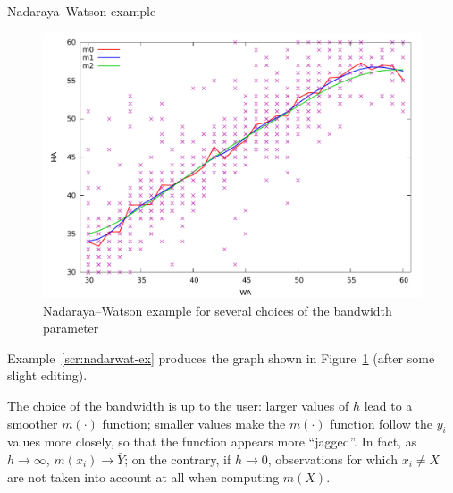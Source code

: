 \begin{script}[htbp]
  \caption{Nadaraya--Watson example}
  \label{scr:nadarwat-ex}
\end{script}

\begin{figure}[htbp]
  \centering
  \includegraphics[scale=0.5]{figures/nadarwat-ex}
  \caption{Nadaraya--Watson example for several choices of the bandwidth parameter}
  \label{fig:nadarwat-ex}
\end{figure}

Example~\ref{scr:nadarwat-ex} produces the graph shown in
Figure~\ref{fig:nadarwat-ex} (after some slight editing).

The choice of the bandwidth is up to the user: larger values of $h$
lead to a smoother $m(\cdot)$ function; smaller values make the
$m(\cdot)$ function follow the $y_i$ values more closely, so that the
function appears more ``jagged''. In fact, as $h \to \infty$, $m(x_i)
\to \bar{Y}$; on the contrary, if $h $, observations for which
$x_i \ne X$ are not taken into account at all when computing $m(X)$.

